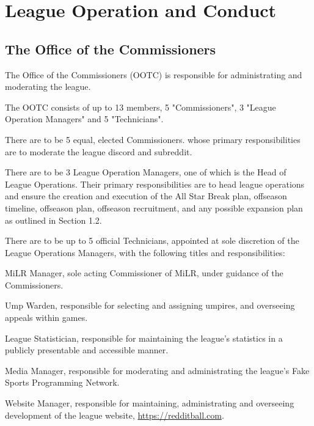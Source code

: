 
\section{League Operation and Conduct}

\subsection{The Office of the Commissioners}
\begin{deepEnumerate}
	\item The Office of the Commissioners (OOTC) is responsible for administrating and moderating the league.
	\item The OOTC consists of up to 13 members, 5 "Commissioners", 3 "League Operation Managers" and 5 "Technicians".
	\begin{deepEnumerate}
		\item There are to be 5 equal, elected Commissioners. whose primary responsibilities are to moderate the league discord and subreddit.
		\item There are to be 3 League Operation Managers, one of which is the Head of League Operations. Their primary responsibilities are to head league operations
		and ensure the creation and execution of the All Star Break plan, offseason timeline, offseason plan, offseason recruitment, and any possible expansion plan 
		as outlined in Section 1.2.
		\item There are to be up to 5 official Technicians, appointed at sole discretion of the League Operations Managers, with the following titles and responsibilities:
		\begin{deepEnumerate}
			\item MiLR Manager, sole acting Commissioner of MiLR, under guidance of the Commissioners.
			\item Ump Warden, responsible for selecting and assigning umpires, and overseeing appeals within games.
			\item League Statistician, responsible for maintaining the league's statistics in a publicly presentable and accessible manner.
			\item Media Manager, responsible for moderating and administrating the league's Fake Sports Programming Network.
			\item Website Manager, responsible for maintaining, administrating and overseeing development of the league website, \url{https://redditball.com}.
		\end{deepEnumerate}

\end{deepEnumerate}
\end{deepEnumerate}
